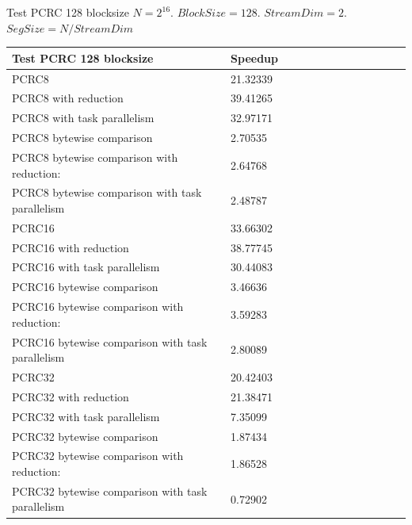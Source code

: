 \documentclass[10pt]{beamer}
\begin{document}
\begin{frame}[fragile]{Test PCRC 128 blocksize}
$N=2^{16}$. $BlockSize=128$. $StreamDim=2$. $SegSize=N/StreamDim$
\begin{footnotesize}
\begin{tabular}{l|l|l|l|l|r|r|r|r|r|r||c|c|}
\toprule
\textbf{Test PCRC 128 blocksize} & \textbf{Speedup} \\
\midrule
PCRC8                                           &	21.32339 \\
PCRC8 with reduction                            &	39.41265 \\
PCRC8 with task parallelism                     &	32.97171 \\
PCRC8 bytewise comparison                       &	2.70535  \\
PCRC8 bytewise comparison with reduction:       &	2.64768  \\
PCRC8 bytewise comparison with task parallelism &	2.48787  \\
PCRC16                                           &	33.66302 \\
PCRC16 with reduction                            &	38.77745 \\
PCRC16 with task parallelism                     &	30.44083 \\
PCRC16 bytewise comparison                       &	3.46636  \\
PCRC16 bytewise comparison with reduction:       &	3.59283  \\
PCRC16 bytewise comparison with task parallelism &	2.80089  \\
PCRC32                                           &	20.42403 \\
PCRC32 with reduction                            &	21.38471 \\
PCRC32 with task parallelism                     &	7.35099  \\
PCRC32 bytewise comparison                       &	1.87434  \\
PCRC32 bytewise comparison with reduction:       &	1.86528  \\
PCRC32 bytewise comparison with task parallelism &	0.72902  \\
\bottomrule
\end{tabular}
\end{footnotesize}
\end{frame}
\end{document}
